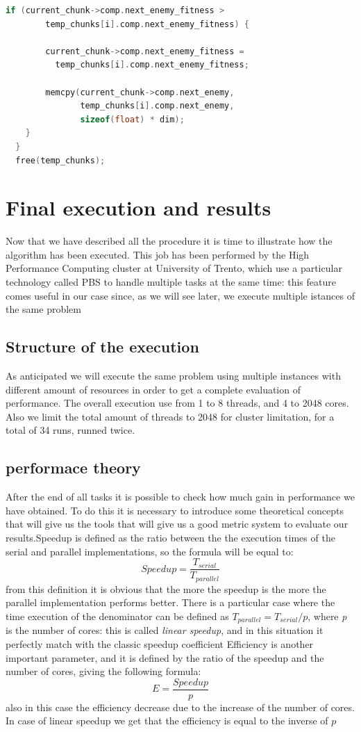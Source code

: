 \documentclass[10pt]{article}
\begin{document}
\begin{multicols}{2}
\begin{lstlisting}[language=C,caption={the parallel version of \textit{computation\_accumulate}}]
    if (current_chunk->comp.next_enemy_fitness >
        temp_chunks[i].comp.next_enemy_fitness) {

        current_chunk->comp.next_enemy_fitness =
          temp_chunks[i].comp.next_enemy_fitness;

        memcpy(current_chunk->comp.next_enemy, 
               temp_chunks[i].comp.next_enemy,
               sizeof(float) * dim);
    }
  }
  free(temp_chunks);
  \end{lstlisting}


\section{Final execution and results}
Now that we have described all the procedure it is time to illustrate how 
the algorithm has been executed. This job has been performed by the
High Performance Computing cluster at University of Trento, which 
use a particular technology called PBS to handle multiple tasks at the same
time: this feature comes useful in our case since, as we will see later, we 
execute multiple istances of the same problem
\subsection*{Structure of the execution}

As anticipated we will execute the same problem using multiple instances with different amount of
resources in order to get a complete evaluation of performance. The overall execution use from 1 to 8
threads, and 4 to 2048 cores. Also we limit the total amount of threads to 2048 for cluster limitation, for a total of 34 runs, runned twice.

\subsection*{performace theory}

After the end of all tasks it is possible to check how much gain in performance we have obtained.
To do this it is necessary to introduce some theoretical concepts that will give us the tools that
will give us a good metric system to evaluate our results.Speedup is defined as the ratio between the the execution times of the serial and parallel
implementations, so the formula will be equal to: $$Speedup = \frac{T_{serial}}{T_{parallel}}$$ 
from this definition it is obvious that the more the speedup is the more the parallel implementation
performs better. There is a particular case where the time execution of the denominator can be defined
as $T_{parallel}=T_{serial}/p$, where \textit{p} is the number of cores: this is called \textit{linear speedup},
and in this situation it perfectly match with the classic speedup coefficient
Efficiency is another important parameter, and it is defined by the ratio of the speedup and the 
number of cores, giving the following formula: $$E = \frac{Speedup}{p}$$
also in this case the efficiency decrease due to the increase of the number of cores. In case
of linear speedup we get that the efficiency is equal to the inverse of $p$

\end{multicols}
\end{document}
